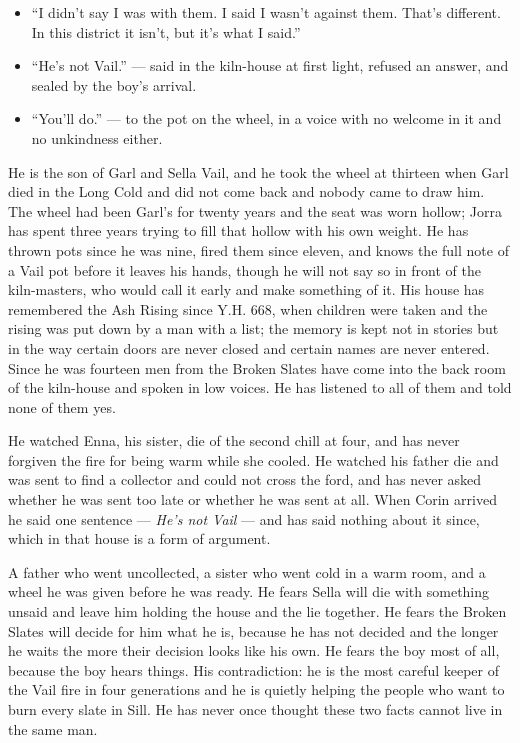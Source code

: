\documentclass{design/chronicle}
\begin{document}
{\begin{itemize}[leftmargin=1.4em,itemsep=1pt,topsep=3pt,parsep=0pt]
\item “I didn’t say I was with them. I said I wasn’t against them. That’s different. In this district it isn’t, but it’s what I said.”

\item “He’s not Vail.” --- said in the kiln-house at first light, refused an answer, and sealed by the boy’s arrival.

\item “You’ll do.” --- to the pot on the wheel, in a voice with no welcome in it and no unkindness either.

\end{itemize}

He is the son of Garl and Sella Vail, and he took the wheel at thirteen when Garl died in the Long Cold and did not come back and nobody came to draw him. The wheel had been Garl’s for twenty years and the seat was worn hollow; Jorra has spent three years trying to fill that hollow with his own weight. He has thrown pots since he was nine, fired them since eleven, and knows the full note of a Vail pot before it leaves his hands, though he will not say so in front of the kiln-masters, who would call it early and make something of it. His house has remembered the Ash Rising since Y.H. 668, when children were taken and the rising was put down by a man with a list; the memory is kept not in stories but in the way certain doors are never closed and certain names are never entered. Since he was fourteen men from the Broken Slates have come into the back room of the kiln-house and spoken in low voices. He has listened to all of them and told none of them yes.

He watched Enna, his sister, die of the second chill at four, and has never forgiven the fire for being warm while she cooled. He watched his father die and was sent to find a collector and could not cross the ford, and has never asked whether he was sent too late or whether he was sent at all. When Corin arrived he said one sentence — \emph{He’s not Vail} — and has said nothing about it since, which in that house is a form of argument.

A father who went uncollected, a sister who went cold in a warm room, and a wheel he was given before he was ready. He fears Sella will die with something unsaid and leave him holding the house and the lie together. He fears the Broken Slates will decide for him what he is, because he has not decided and the longer he waits the more their decision looks like his own. He fears the boy most of all, because the boy hears things. His contradiction: he is the most careful keeper of the Vail fire in four generations and he is quietly helping the people who want to burn every slate in Sill. He has never once thought these two facts cannot live in the same man.

}
\end{document}

